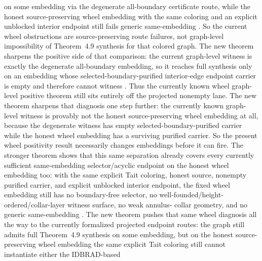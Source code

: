 \documentclass[11pt]{article}
\begin{document}
on some embedding via the degenerate all-boundary certificate route, while the
honest source-preserving wheel embedding with the same coloring and an
explicit unblocked interior endpoint still fails generic same-embedding
.  So the current wheel
obstructions are source-preserving route failures, not graph-level
impossibility of Theorem~4.9 synthesis for that colored graph.  The new theorem
sharpens the positive side of that comparison: the current graph-level
witness is exactly the degenerate all-boundary embedding, so it reaches full
synthesis only on an embedding whose selected-boundary-purified interior-edge
endpoint carrier is empty and therefore cannot witness
.  Thus the currently
known wheel graph-level positive theorem still sits entirely off the
projected nonempty lane.  The new theorem
sharpens that diagnosis one step further: the currently known graph-level
witness is provably not the honest source-preserving wheel embedding at all,
because the degenerate witness has empty selected-boundary-purified carrier
while the honest wheel embedding has a surviving purified carrier.  So the
present wheel positivity result necessarily changes embeddings before it can
fire.  The stronger
theorem
shows that this same separation already covers every currently sufficient
same-embedding selector/acyclic endpoint on the honest wheel embedding too:
with the same explicit Tait coloring, honest source, nonempty purified
carrier, and explicit unblocked interior endpoint, the fixed wheel embedding
still has no boundary-free selector, no
well-founded/height-ordered/collar-layer witness surface, no weak annulus-
collar geometry, and no generic same-embedding
.  The new theorem
pushes that same wheel diagnosis all the way to the currently formalized
projected endpoint routes: the graph still admits full Theorem~4.9 synthesis
on some embedding, but on the honest source-preserving wheel embedding the
same explicit Tait coloring still cannot instantiate either the IDBRAD-based
\end{document}
